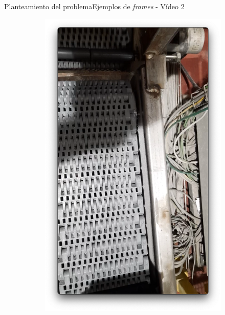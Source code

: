 \documentclass{beamer}
\begin{document}
\begin{frame}{Planteamiento del problema}{Ejemplos de \textit{frames} - Vídeo 2}
\begin{figure}
\centering
    \begin{subfigure}[t]{0.4\textwidth}
        \includegraphics[width=\textwidth]{img/B3.png}
    \end{subfigure}
    \begin{subfigure}[b]{0.4\textwidth}

\end{subfigure}
\end{figure}
\end{frame}
\end{document}
